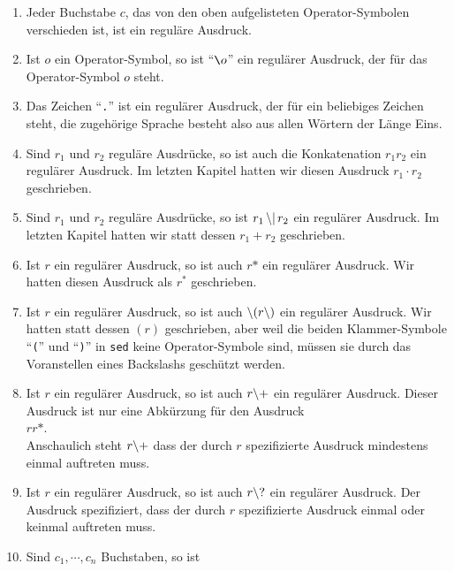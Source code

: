\begin{enumerate}
\item Jeder Buchstabe $c$, das von den oben aufgelisteten Operator-Symbolen verschieden ist,
      ist ein regul\"are Ausdruck.
\item Ist $o$ ein Operator-Symbol, so ist ``$\texttt{\symbol{92}}o$'' ein regul\"arer
      Ausdruck, der f\"ur das Operator-Symbol $o$ steht.
\item Das Zeichen ``\texttt{.}'' ist ein regul\"arer Ausdruck, der f\"ur ein beliebiges
      Zeichen steht, die zugeh\"orige Sprache besteht also aus allen W\"ortern der L\"ange Eins.
\item Sind $r_1$ und $r_2$ regul\"are Ausdr\"ucke, so ist auch die Konkatenation $r_1r_2$
      ein regul\"arer Ausdruck.  Im letzten Kapitel hatten wir  diesen Ausdruck $r_1 \cdot r_2$
      geschrieben.
\item Sind $r_1$ und $r_2$ regul\"are Ausdr\"ucke, so ist  $r_1\,\mathtt{\symbol{92}|}\,r_2$
      ein regul\"arer Ausdruck.  Im letzten Kapitel hatten wir statt dessen $r_1 + r_2$
      geschrieben.
\item Ist $r$ ein regul\"arer Ausdruck, so ist auch $r\mathtt{*}$ ein regul\"arer Ausdruck.
      Wir hatten diesen Ausdruck als $r^*$ geschrieben.
\item Ist $r$ ein regul\"arer Ausdruck, so ist auch
      $\mathtt{\symbol{92}(}r\mathtt{\symbol{92})}$
      ein regul\"arer Ausdruck.  Wir hatten statt dessen $(r)$ geschrieben, aber weil die
      beiden Klammer-Symbole ``\texttt{(}'' und ``\texttt{)}'' in \texttt{sed} keine
      Operator-Symbole sind, m\"ussen sie durch das Voranstellen eines Backslashs gesch\"utzt 
      werden.
\item Ist $r$ ein regul\"arer Ausdruck, so ist auch $r\mathtt{\symbol{92}+}$ ein regul\"arer
      Ausdruck.   Dieser Ausdruck ist nur eine Abk\"urzung f\"ur den Ausdruck
      \\[0.2cm]
      \hspace*{1.3cm}
      $rr\mathtt{*}$.
      \\[0.2cm]
      Anschaulich steht $r\mathtt{\symbol{92}+}$ dass der durch $r$ spezifizierte
      Ausdruck mindestens einmal auftreten muss.
\item Ist $r$ ein regul\"arer Ausdruck, so ist auch $r\mathtt{\symbol{92}?}$ ein regul\"arer
      Ausdruck.  Der Ausdruck spezifiziert,
       dass der durch $r$ spezifizierte
      Ausdruck einmal oder keinmal auftreten muss.
\item Sind $c_1, \cdots, c_n$ Buchstaben, so ist

\end{enumerate}
